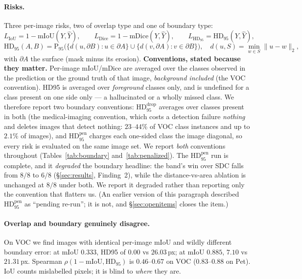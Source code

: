 \documentclass[11pt]{article}
\theoremstyle{remark}
\newcommand{\Yhat}{\widehat{Y}}
\newcommand{\HDF}{\mathrm{HD}_{95}}
\newcommand{\Dice}{\mathrm{Dice}}
\newcommand{\IoU}{\mathrm{IoU}}
\newcommand{\bd}{\partial}
\begin{document}
\paragraph{Risks.} Three per-image risks, two of overlap type and one of boundary
type:
\begin{equation}
L_{\IoU} = 1 - \mathrm{mIoU}(Y,\Yhat), \qquad
L_{\Dice} = 1 - \mathrm{mDice}(Y,\Yhat), \qquad
L_{\HDF} = \HDF(Y,\Yhat),
\end{equation}
\begin{equation}\label{eq:hd95}
\HDF(A,B) = \mathrm{P}_{95}\Big(
\{ d(u,\bd B) : u\in\bd A \} \cup \{ d(v,\bd A) : v\in\bd B \}
\Big),
\quad d(u,S)=\min_{w\in S}\lVert u-w\rVert_2 ,
\end{equation}
with $\bd A$ the surface (mask minus its erosion). \textbf{Conventions, stated
because they matter.} Per-image mIoU/mDice are averaged over the classes observed
in the prediction or the ground truth of that image, \emph{background included}
(the VOC convention). HD95 is averaged over \emph{foreground} classes only, and is
undefined for a class present on one side only --- a hallucinated or a wholly
missed class. We therefore report two boundary conventions: $\HDF^{\mathrm{drop}}$
averages over classes present in both (the medical-imaging convention, which costs
a detection failure \emph{nothing} and deletes images that detect nothing:
$23$--$44\%$ of VOC class instances and up to $2.1\%$ of images), and
$\HDF^{\mathrm{pen}}$ charges each one-sided class the image diagonal, so every
risk is evaluated on the same image set. We report \emph{both} conventions throughout
(Tables~\ref{tab:boundary} and~\ref{tab:penalized}). The $\HDF^{\mathrm{pen}}$ run is
complete, and it \emph{degraded} the boundary headline: the band's win over SDC falls
from $8/8$ to $6/8$ (\S\ref{sec:results}, Finding~2), while the distance-vs-area
ablation is unchanged at $8/8$ under both. We report it degraded rather than reporting
only the convention that flatters us. (An earlier version of this paragraph described
$\HDF^{\mathrm{pen}}$ as ``pending re-run''; it is not, and \S\ref{sec:openitems}
closes the item.)

\paragraph{Overlap and boundary genuinely disagree.} On VOC we find images with
identical per-image mIoU and wildly different boundary error: at mIoU $0.333$,
HD95 of $0.00$ vs $26.03$\,px; at mIoU $0.885$, $7.10$ vs $21.31$\,px. Spearman
$\rho(1-\mathrm{mIoU},\HDF)$ is $0.46$--$0.67$ on VOC ($0.83$--$0.88$ on Pet). IoU
counts mislabelled pixels; it is blind to \emph{where} they are.
\end{document}
